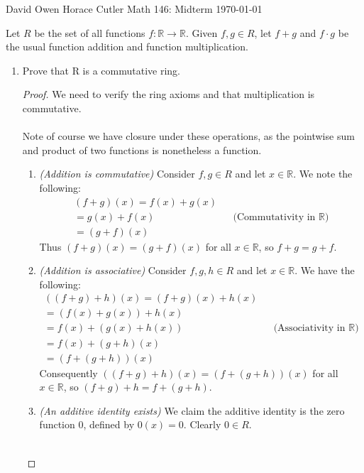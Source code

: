 \documentclass[12pt]{article}
\newenvironment{ex}[2][Exercise]{\begin{trivlist}
\item[\hskip \labelsep {\bfseries #1}\hskip \labelsep {\bfseries #2.}]}{\end{trivlist}}
\begin{document}
\noindent David Owen Horace Cutler \hfill {\Large Math 146: Midterm} \hfill \today

\begin{ex}{1}
    Let $R$ be the set of all functions $f : \mathbb{R} \rightarrow \mathbb{R}$. Given $f, g \in R$, let $f + g$ and $f \cdot g$ be the usual function addition and function multiplication.
    \begin{enumerate}[label=(\alph*)]
        \item Prove that R is a commutative ring. 
        \begin{proof}
        We need to verify the ring axioms and that multiplication is commutative. \\ \\
        Note of course we have closure under these operations, as the pointwise sum and product of two functions is nonetheless a function.
        \begin{enumerate}[label=(\roman*)]
            \item \textit{(Addition is commutative)} Consider $f, g \in R$ and let $x \in \mathbb{R}$. We note the following:
            \begin{align*}
                (f + g)(x) = f(x) + g(x) \\
                = g(x) + f(x) && \text{(Commutativity in }\mathbb{R}) \\
                = (g + f)(x) 
            \end{align*}
            Thus $(f + g)(x) = (g + f)(x)$ for all $x \in \mathbb{R}$, so $f + g = g + f$. 
            \item \textit{(Addition is associative)} Consider $f, g, h \in R$ and let $x \in \mathbb{R}$. We have the following:
            \begin{align*}
                ((f + g) + h)(x) = (f + g)(x) + h(x) \\
                = (f(x) + g(x)) + h(x) \\
                = f(x) + (g(x) + h(x)) && \text{(Associativity in }\mathbb{R}) \\
                = f(x) + (g + h)(x) \\
                = (f + (g + h))(x)
             \end{align*}
             Consequently $((f + g) + h)(x) = (f + (g + h))(x)$ for all $x \in \mathbb{R}$, so $(f + g) + h = f + (g + h)$.
             \item \textit{(An additive identity exists)} We claim the additive identity is the zero function $0$, defined by ${0}(x) = 0$. Clearly $0 \in R$. \\ \\

\end{enumerate}
\end{proof}
\end{enumerate}
\end{ex}
\end{document}
